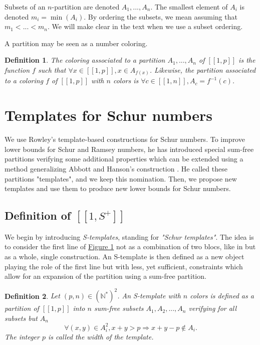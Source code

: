 \documentclass{article}
\newtheorem{definition}{Definition}[section]
\newtheorem{computational theorem}[definition]{Computational Theorem}
\begin{document}
Subsets of an \(n\)-partition are denoted \(A_1, ..., A_n\). The smallest element of \(A_i\) is denoted
\(m_i = \min(A_i)\). By ordering the subsets, we mean assuming that \(m_1 < ... < m_n\). We will make clear in the text
when we use a subset ordering.

A partition may be seen as a number coloring.

\begin{definition}
The coloring associated to a partition \(A_1, ..., A_n\) of
\([\![1, p]\!]\) is the function \(f\) such that \(\forall x \in [\![1, p]\!], x \in A_{f(x)}\). Likewise, the partition associated to
a coloring \(f\) of \([\![1, p]\!]\) with \(n\) colors is \(\forall c \in [\![1, n]\!], A_c = f^{-1}(c)\).
\end{definition}


\section{Templates for Schur numbers}
\label{Schur}

We use Rowley's template-based constructions \cite{RowleyRamsey} for Schur 
numbers. To improve lower bounds for Schur and Ramsey numbers, he has introduced special sum-free 
partitions verifying some additional properties which can be extended using a method generalizing Abbott and 
Hanson's construction \cite{AbbottHanson}. He called these partitions "templates", and we keep this nomination. 
Then, we propose new templates and use them to produce new lower bounds for Schur numbers.

\subsection{Definition of \( [\![ 1, S^+ ]\!] \)}

We begin by introducing \textit{S-templates}, standing for \textit{"Schur templates"}. The idea is to consider the first line
of \hyperref[figure:1]{Figure 1} not as a combination of two blocs, like in \cite{AbbottHanson} but as a whole, single construction. 
An S-template is then defined as a new object playing the role of the first line but with less, yet sufficient, 
constraints which allow for an expansion of the partition using a sum-free partition.

\begin{definition}
Let \((p,n) \in (\mathbb{N}^*)^2\). An S-template with \(n\) colors is defined as a partition of 
\([\![1,p]\!]\) into \(n\) sum-free subsets \(A_1, A_2, ..., A_n\) verifying for all subsets but \(A_n\)
\begin{equation}
\label{eq:constemp}
\forall (x,y) \in A_i^2, x+y > p
\Longrightarrow x+y-p \notin A_i.
\end{equation}
The integer \(p\) is called the \textit{width} of the template.
\end{definition}
\end{document}
